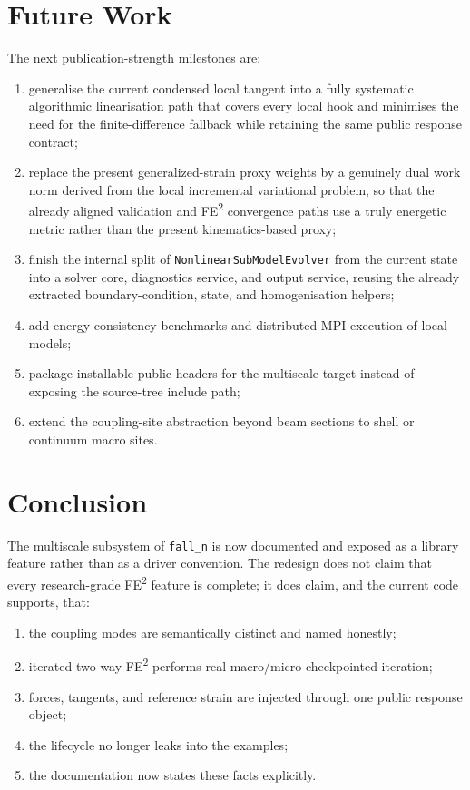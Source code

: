 \section{Future Work}
\label{sec:ms-pub-future}

The next publication-strength milestones are:
\begin{enumerate}
  \item generalise the current condensed local tangent into a fully systematic
    algorithmic linearisation path that covers every local hook and minimises
    the need for the finite-difference fallback while retaining the same
    public response contract;
  \item replace the present generalized-strain proxy weights by a genuinely
    dual work norm derived from the local incremental variational problem, so
    that the already aligned validation and FE\textsuperscript{2} convergence
    paths use a truly energetic metric rather than the present kinematics-based
    proxy;
  \item finish the internal split of \texttt{NonlinearSubModelEvolver} from
    the current state into a solver core, diagnostics service, and output
    service, reusing the already extracted boundary-condition, state, and
    homogenisation helpers;
  \item add energy-consistency benchmarks and distributed MPI execution of
    local models;
  \item package installable public headers for the multiscale target instead of
    exposing the source-tree include path;
  \item extend the coupling-site abstraction beyond beam sections to shell or
    continuum macro sites.
\end{enumerate}

\section{Conclusion}
\label{sec:ms-pub-conclusion}

The multiscale subsystem of \texttt{fall\_n} is now documented and exposed as a
library feature rather than as a driver convention.  The redesign does not
claim that every research-grade FE\textsuperscript{2} feature is complete; it
does claim, and the current code supports, that:
\begin{enumerate}
  \item the coupling modes are semantically distinct and named honestly;
  \item iterated two-way FE\textsuperscript{2} performs real macro/micro
    checkpointed iteration;
  \item forces, tangents, and reference strain are injected through one public
    response object;
  \item the lifecycle no longer leaks into the examples;
  \item the documentation now states these facts explicitly.
\end{enumerate}
